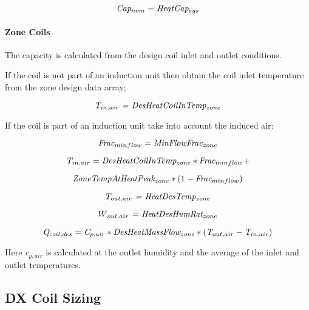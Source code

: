 \begin{equation}
\emph{Cap\(_{nom}\)} = \emph{HeatCap\(_{sys}\)}
\end{equation}

\paragraph{Zone Coils}\label{zone-coils-3}

The capacity is calculated from the design coil inlet and outlet conditions.

If the coil is not part of an induction unit then obtain the coil inlet temperature from the zone design data array;

\begin{equation}
\emph{T\(_{in,air}\) = DesHeatCoilInTemp\(_{zone}\)}
\end{equation}

If the coil is part of an induction unit take into account the induced air:

\begin{equation}
\emph{Frac\(_{minflow}\)} = \emph{MinFlowFrac\(_{zone}\)}
\end{equation}

\begin{equation}
\emph{T\(_{in,air}\)} = \emph{DesHeatCoilInTemp\(_{zone}\)} * \emph{Frac\(_{minflow}\)} +
\end{equation}

\begin{equation}
\emph{ZoneTempAtHeatPeak\(_{zone}\)} *(1- \emph{Frac\(_{minflow}\)})
\end{equation}

\begin{equation}
\emph{T\(_{out,air}\) = HeatDesTemp\(_{zone}\)}
\end{equation}

\begin{equation}
W\emph{\(_{out,air}\) = HeatDesHumRat\(_{zone}\)}
\end{equation}

\begin{equation}
\emph{Q\(_{coil,des}\)} = \emph{C\(_{p,air}\)} * \emph{DesHeatMassFlow\(_{zone}\)} *(\emph{T\(_{out,air}\)}-\emph{T\(_{in,air}\)})
\end{equation}

Here \emph{c\(_{p,air}\)} is calculated at the outlet humidity and the average of the inlet and outlet temperatures.

\subsection{DX Coil Sizing}\label{dx-coil-sizing}

